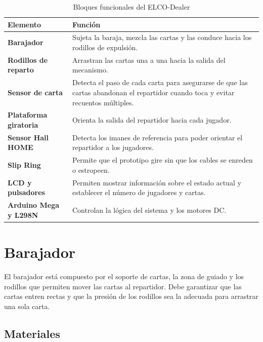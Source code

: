 \documentclass[a4paper, 11pt]{article}
\begin{document}
\begin{table}[H]
\centering
\small
\begin{tabularx}{\textwidth}{>{\bfseries}p{}X}
\hline
\textbf{Elemento} & \textbf{Función} \\
\hline
Barajador & Sujeta la baraja, mezcla las cartas y las conduce hacia los rodillos de expulsión. \\
Rodillos de reparto & Arrastran las cartas una a una hacia la salida del mecanismo. \\
Sensor de carta & Detecta el paso de cada carta para asegurarse de que las cartas abandonan el repartidor cuando toca y evitar recuentos múltiples. \\
Plataforma giratoria & Orienta la salida del repartidor hacia cada jugador. \\
Sensor Hall HOME & Detecta los imanes de referencia para poder orientar el repartidor a los jugadores. \\
Slip Ring & Permite que el prototipo gire sin que los cables se enreden o estropeen. \\
LCD y pulsadores & Permiten mostrar información sobre el estado actual y establecer el número de jugadores y cartas. \\
Arduino Mega y L298N & Controlan la lógica del sistema y los motores DC. \\
\hline
\end{tabularx}
\caption{Bloques funcionales del ELCO-Dealer}
\label{tab:manual_bloques}
\end{table}

\section{Barajador}

El barajador está compuesto por el soporte de cartas, la zona de guiado y los rodillos que permiten mover las cartas al repartidor. Debe garantizar que las cartas entren rectas y que la presión de los rodillos sea la adecuada para arrastrar una sola carta.

\subsection{Materiales}
\end{document}
